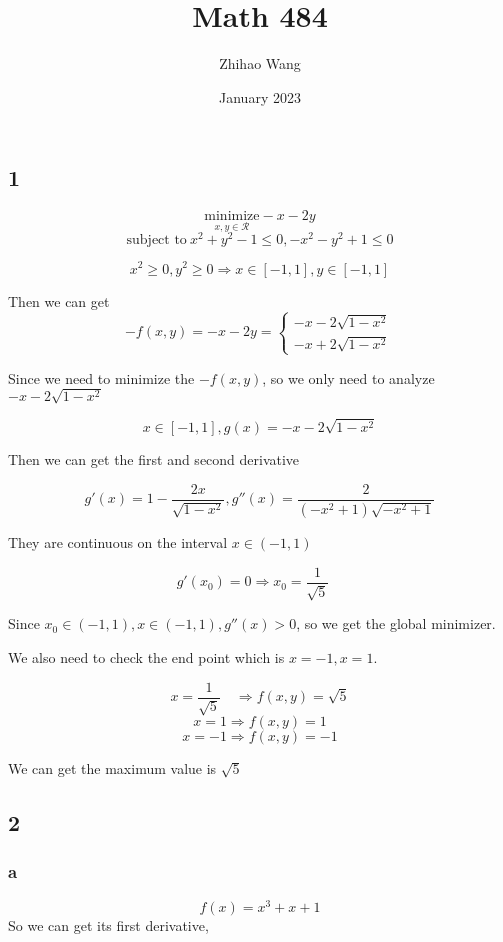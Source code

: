 \documentclass{article}
\title{Math 484}
\author{Zhihao Wang}
\date{January 2023}
\def\implies{\Longrightarrow}
\begin{document}
\maketitle

\subsection*{1}
$$\text{minimize} \limits_{x, y \in \mathcal{R}} -x - 2y$$
$$\text{subject to} \ x^2 + y^2 - 1 \le 0, -x^2 - y^2 + 1 \le 0$$

$$x^2 \ge 0, y^2 \ge 0 \implies x \in [-1, 1], y \in [-1, 1]$$

Then we can get 
\begin{equation*}
-f(x, y) = -x - 2y =
\begin{cases}
-x - 2 \sqrt{1 - x^2} \\
-x + 2 \sqrt{1 - x^2} 
\end{cases}
\end{equation*}

Since we need to minimize the $-f(x, y)$, so we only need to analyze $-x - 2 \sqrt{1 - x^2}$

$$x \in [-1, 1], g(x) = -x - 2 \sqrt{1 - x^2}$$

Then we can get the first and second derivative

$$g'(x) = 1-\frac{2x}{\sqrt{1-x^2}}, g''(x) = \frac{2}{\left(-x^2+1\right)\sqrt{-x^2+1}}$$ 

They are continuous on the interval $x \in (-1, 1)$

$$g'(x_0) = 0 \implies x_0 = \frac{1}{\sqrt{5}}\quad$$

Since $x_0 \in (-1, 1), x \in (-1, 1), g''(x) > 0$, so we get the global minimizer. 

We also need to check the end point which is $x = -1, x = 1$.

$$x = \frac{1}{\sqrt{5}}\quad \implies f(x, y) = \sqrt{5}$$
$$x = 1 \implies f(x, y) = 1$$
$$x = -1 \implies f(x, y) = -1$$

We can get the maximum value is $\sqrt{5}$

\subsection*{2}
\subsubsection*{a}
$$f(x) = x^3 + x + 1$$ 
So we can get its first derivative,
\end{document}
